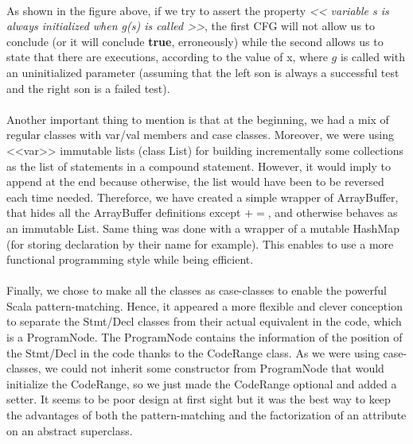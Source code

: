 \documentclass{report}
\begin{document}
\paragraph{}
\hspace{4mm}\textnormal{As shown in the figure above, if we try to
assert the property \textit {<< variable s is always initialized when g(s) is called >>}, the first CFG will not allow us to conclude
(or it will conclude \textbf {true}, erroneously) while the second allows us
to state that there are executions, according to the value of x,
where $g$ is called with an uninitialized parameter
(assuming that the left son is always a successful test and the right son is a failed test).}

\paragraph{}
\hspace{4mm}\textnormal{Another important thing to mention is that at the beginning, we had a mix of regular classes with
var/val members and case classes. Moreover, we were using <<var>> immutable lists (class List) for building
incrementally some collections as the list of statements in a compound statement. However, it would imply to append at the end
because otherwise, the list would have been to be reversed each time needed. Thereforce, we have created a simple wrapper of ArrayBuffer,
that hides all the ArrayBuffer definitions except $+=$, and otherwise behaves as an immutable List. Same thing was done with
a wrapper of a mutable HashMap (for storing declaration by their name for example). This enables to use 
a more functional programming style while being efficient.}

\paragraph{}
\hspace{4mm}\textnormal{Finally, we chose to make all the classes as case-classes to enable the powerful Scala pattern-matching.
Hence, it appeared a more flexible and clever conception to separate the Stmt/Decl classes from their 
actual equivalent in the code, which is a ProgramNode. The ProgramNode contains the information of the position
of the Stmt/Decl in the code thanks to the CodeRange class. As we were using case-classes, we could not inherit some constructor from
ProgramNode that would initialize the CodeRange, so we just made the CodeRange optional and added a setter. It seems to be poor design
at first sight but it was the best way to keep the advantages of both the pattern-matching and the factorization of an attribute 
on an abstract superclass.}
\end{document}
